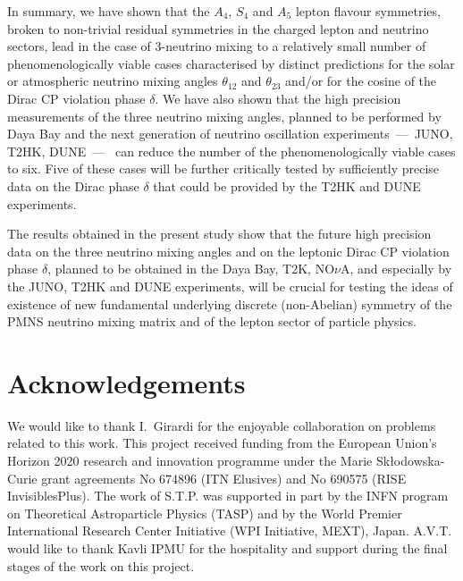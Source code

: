 \documentclass[11pt,a4paper]{article}
\numberwithin{equation}{section}
\begin{document}
 In summary, we have shown that  the $A_4$, $S_4$ and $A_5$ 
lepton flavour symmetries, broken to non-trivial residual symmetries
in the charged lepton and neutrino sectors,
lead in the case of 3-neutrino mixing
to a relatively small number of phenomenologically 
viable cases characterised by distinct predictions for 
the solar or atmospheric neutrino 
mixing angles $\theta_{12}$ and $\theta_{23}$  and/or for 
the cosine of the Dirac CP violation phase $\delta$. 
We have also shown that the high precision measurements 
of the three neutrino 
mixing angles, planned to be performed by Daya Bay 
and the next generation of neutrino 
oscillation experiments~---~JUNO, T2HK, DUNE~---~%
can reduce the number of the phenomenologically 
viable cases to six. Five of these cases will be further 
critically tested by sufficiently precise data on 
the Dirac phase $\delta$ that could be provided by the 
T2HK and DUNE experiments.

 The results obtained in the present study 
show that the future high precision data 
on the three neutrino mixing angles and on 
the leptonic Dirac CP violation phase $\delta$, planned 
to be obtained in the Daya Bay, T2K, NO$\nu$A, 
and especially by the JUNO, T2HK and DUNE experiments,
will be crucial for testing the ideas 
of existence of new fundamental underlying  discrete (non-Abelian) symmetry 
of the PMNS neutrino mixing matrix and of the lepton sector of particle physics.


\section*{Acknowledgements}

 We would like to thank I.~Girardi for the enjoyable collaboration 
on problems related to this work. 
This project received funding from the European Union's Horizon 2020 
research and innovation programme
under the Marie Sk\l{}odowska-Curie grant agreements 
No 674896 (ITN Elusives) and No 690575 (RISE InvisiblesPlus).
The work of S.T.P. was supported in part
by the INFN program on Theoretical Astroparticle Physics (TASP) 
and by the  World Premier International Research Center
Initiative (WPI Initiative, MEXT), Japan. 
A.V.T. would like to thank Kavli IPMU for the hospitality and support 
during the final stages of the work on this project. 





\end{document}
